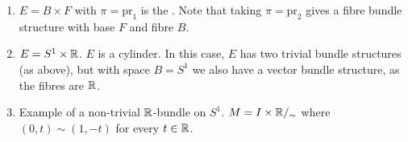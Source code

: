 \documentclass[main.tex]{subfiles}
\begin{document}
\noindent\begin{exmp}
\begin{enumerate} \hspace{1em} \\
    \item  $E = B \times F$ with $\pi = \text{pr}_1$ is the . Note that taking $\pi = \text{pr}_2$ gives a fibre bundle structure with base $F$ and fibre $B$.
    \item $E = S^1 \times \mathbb{R}$. $E$ is a cylinder. In this case, $E$ has two trivial bundle structures (as above), but with space $B = S^1$ we also have a vector bundle structure, as the fibres are $\mathbb{R}$.
    \item {} Example of a non-trivial $\mathbb{R}$-bundle on $S^1$. $M = I \times \mathbb{R}/_\sim$ where $(0,t) \sim (1, -t)$ for every $t \in \mathbb{R}$.


\end{enumerate}
\end{exmp}
\end{document}
